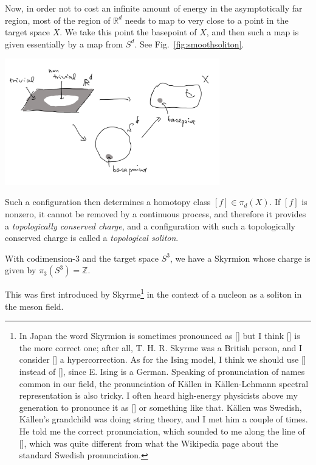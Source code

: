\documentclass[12pt]{article}
\numberwithin{equation}{section}
\numberwithin{figure}{section}
\theoremstyle{remark}
\renewenvironment{figure}[1][]{
  \begin{originalfigure}[#1]
    \begin{mdframed}[linecolor=black!0,backgroundcolor=black!1]
}{
    \end{mdframed}
  \end{originalfigure}
}
\def\bR{\mathbb{R}}
\def\bZ{\mathbb{Z}}
\begin{document}
Now, in order not to cost an infinite amount of energy in the asymptotically far region,
most of the region of $\bR^d$ needs to map to very close to a point in the target space $X$.
We take this point the basepoint of $X$,
and then such a map is given essentially by a map from $S^d$.
See Fig.~\ref{fig:smoothsoliton}.


\begin{figure}[h]
\centering
  \includegraphics[width=0.7\textwidth]{smoothsoliton.png}
  \caption{A smooth, finite-energy, codimension-$d$ configuration is given by a map $S^d\to X$. }
  \label{fig:smoothsoliton}
\end{figure}

Such a configuration then determines a homotopy class $ [f]\in \pi_d(X)$.
If $[f]$ is nonzero, it cannot be removed by a continuous process,
and therefore it provides a \emph{topologically conserved charge},
and a configuration with such a topologically conserved charge is called a \emph{topological soliton}.

\begin{example}
With codimension-$3$ and the target space $S^3$, we have a Skyrmion whose charge is given by $\pi_3(S^3)=\bZ$.
\end{example}

This was first introduced by Skyrme\footnote{%
In Japan the word Skyrmion is sometimes pronounced as [] but I think [] is the more correct one;
after all, T. H. R. Skyrme was a British person, and I consider [] a hypercorrection.
As for the Ising model, I think we should use [] instead of [],
since E. Ising is a German.
Speaking of pronunciation of names common in our field, 
the pronunciation of K\"allen in K\"allen-Lehmann spectral representation is also tricky.
I often heard high-energy physicists above my generation to pronounce it as [] or something like that.
K\"allen was Swedish,
K\"allen's grandchild was doing string theory, and I met him a couple of times.
He told me the correct pronunciation, which sounded to me  along the line of [],
which was quite different from what the Wikipedia page about the standard Swedish pronunciation.
} \cite{Skyrme:1961vq,Skyrme:1962vh} in the context of a nucleon as a soliton in the meson field.
\end{document}
